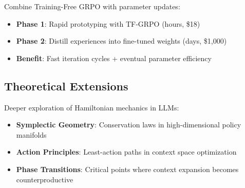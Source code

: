 Combine Training-Free GRPO with parameter updates:

\begin{itemize}
    \item \textbf{Phase 1}: Rapid prototyping with TF-GRPO (hours, \$18)
    \item \textbf{Phase 2}: Distill experiences into fine-tuned weights (days, \$1,000)
    \item \textbf{Benefit}: Fast iteration cycles + eventual parameter efficiency
\end{itemize}

\subsection{Theoretical Extensions}

Deeper exploration of Hamiltonian mechanics in LLMs:

\begin{itemize}
    \item \textbf{Symplectic Geometry}: Conservation laws in high-dimensional policy manifolds
    \item \textbf{Action Principles}: Least-action paths in context space optimization
    \item \textbf{Phase Transitions}: Critical points where context expansion becomes counterproductive
\end{itemize}

